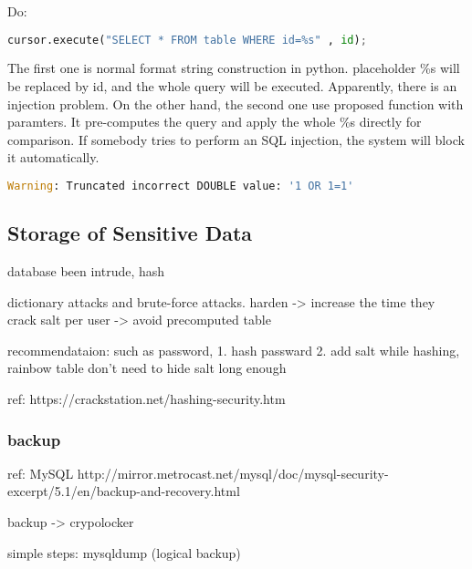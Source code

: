 \documentclass[conference]{IEEEtran}
\begin{document}
Do:
\begin{lstlisting}[language=python]
cursor.execute("SELECT * FROM table WHERE id=%s" , id);
\end{lstlisting}
The first one is normal format string construction in python.
placeholder \%s will be replaced by id,
and the whole query will be executed.
Apparently, there is an injection problem.
On the other hand,
the second one use proposed function with paramters.
It pre-computes the query and apply the whole \%s directly for comparison.
If somebody tries to perform an SQL injection, the system will block it automatically.
\begin{lstlisting}[language=python]
Warning: Truncated incorrect DOUBLE value: '1 OR 1=1'
\end{lstlisting}


\subsection{Storage of Sensitive Data}
database been intrude,
hash


dictionary attacks and brute-force attacks.
harden -> increase the time they crack
salt
per user -> avoid precomputed table

recommendataion:
such as password,
1. hash passward
2. add salt while hashing, rainbow table
    don't need to hide salt
    long enough

ref: https://crackstation.net/hashing-security.htm




\subsubsection{backup}
ref: MySQL
http://mirror.metrocast.net/mysql/doc/mysql-security-excerpt/5.1/en/backup-and-recovery.html

backup
-> crypolocker


simple steps:
mysqldump (logical backup)
\end{document}
